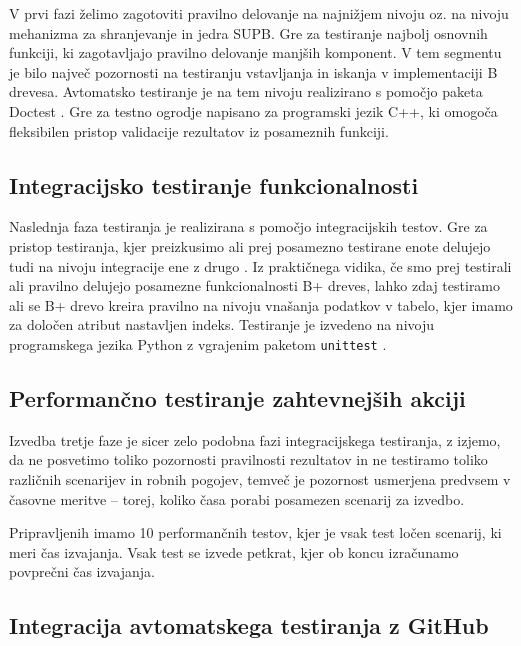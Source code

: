 \documentclass[a4paper,12pt,openright]{book}
\begin{document}
    V prvi fazi želimo zagotoviti pravilno delovanje na najnižjem nivoju oz. na nivoju mehanizma za shranjevanje in jedra SUPB. Gre za testiranje najbolj osnovnih funkciji, ki zagotavljajo pravilno delovanje manjših komponent. V tem segmentu je bilo največ pozornosti na testiranju vstavljanja in iskanja v implementaciji B drevesa. Avtomatsko testiranje je na tem nivoju realizirano s pomočjo paketa Doctest \cite{DOCTEST_GITHUB}. Gre za testno ogrodje napisano za programski jezik C++, ki omogoča fleksibilen pristop validacije rezultatov iz posameznih funkciji.
   
   \subsection{Integracijsko testiranje funkcionalnosti}

    Naslednja faza testiranja je realizirana s pomočjo integracijskih testov. Gre za pristop testiranja, kjer preizkusimo ali prej posamezno testirane enote delujejo tudi na nivoju integracije ene z drugo \cite{brar2015differentiating}. Iz praktičnega vidika, če smo prej testirali ali pravilno delujejo posamezne funkcionalnosti B+ dreves, lahko zdaj testiramo ali se B+ drevo kreira pravilno na nivoju vnašanja podatkov v tabelo, kjer imamo za določen atribut nastavljen indeks. Testiranje je izvedeno na nivoju programskega jezika Python z vgrajenim paketom {\tt unittest} \cite{PY_UNITTEST}.
   
   \subsection{Performančno testiranje zahtevnejših akciji}

    Izvedba tretje faze je sicer zelo podobna fazi integracijskega testiranja, z izjemo, da ne posvetimo toliko pozornosti pravilnosti rezultatov in ne testiramo toliko različnih scenarijev in robnih pogojev, temveč je pozornost usmerjena predvsem v časovne meritve – torej, koliko časa porabi posamezen scenarij za izvedbo.

    Pripravljenih imamo 10 performančnih testov, kjer je vsak test ločen scenarij, ki meri čas izvajanja. Vsak test se izvede petkrat, kjer ob koncu izračunamo povprečni čas izvajanja.
   
   \subsection{Integracija avtomatskega testiranja z GitHub}
\end{document}
